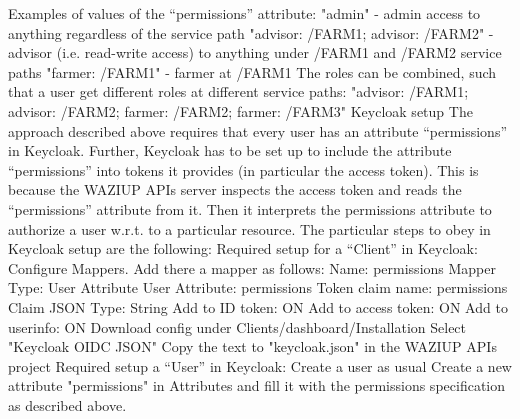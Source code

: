 Examples of values of the “permissions” attribute:
"admin" - admin access to anything regardless of the service path
"advisor: /FARM1; advisor: /FARM2" - advisor (i.e. read-write access) to anything under /FARM1 and /FARM2 service paths
"farmer: /FARM1" - farmer at /FARM1
The roles can be combined, such that a user get different roles at different service paths: "advisor: /FARM1; advisor: /FARM2; farmer: /FARM2; farmer: /FARM3" 
Keycloak setup
The approach described above requires that every user has an attribute “permissions” in Keycloak. Further, Keycloak has to be set up to include the attribute “permissions” into tokens it provides (in particular the access token). This is because the WAZIUP APIs server inspects the access token and reads the “permissions” attribute from it. Then it interprets the permissions attribute to authorize a user w.r.t. to a particular resource. 
The particular steps to obey in Keycloak setup are the following:
Required setup for a “Client” in Keycloak:
Configure Mappers. Add there a mapper as follows:
Name: permissions
Mapper Type: User Attribute
User Attribute: permissions
Token claim name: permissions
Claim JSON Type: String
Add to ID token: ON
Add to access token: ON
Add to userinfo: ON
Download config under Clients/dashboard/Installation
Select "Keycloak OIDC JSON"
Copy the text to "keycloak.json" in the WAZIUP APIs project
Required setup a “User” in Keycloak:
Create a user as usual
Create a new attribute "permissions" in Attributes and fill it with the permissions specification as described above.





